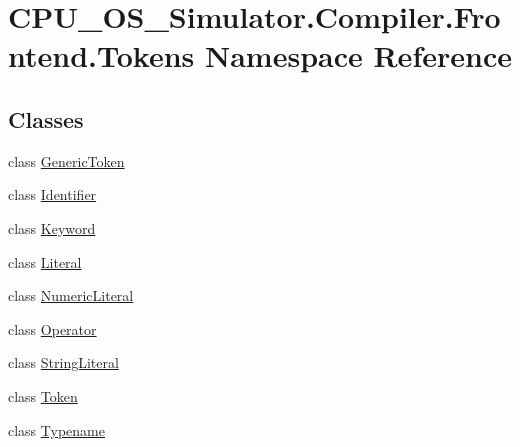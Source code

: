 \hypertarget{namespace_c_p_u___o_s___simulator_1_1_compiler_1_1_frontend_1_1_tokens}{}\section{C\+P\+U\+\_\+\+O\+S\+\_\+\+Simulator.\+Compiler.\+Frontend.\+Tokens Namespace Reference}
\label{namespace_c_p_u___o_s___simulator_1_1_compiler_1_1_frontend_1_1_tokens}
\subsection*{Classes}
\begin{DoxyCompactItemize}
\item 
class \hyperlink{class_c_p_u___o_s___simulator_1_1_compiler_1_1_frontend_1_1_tokens_1_1_generic_token}{Generic\+Token}
\item 
class \hyperlink{class_c_p_u___o_s___simulator_1_1_compiler_1_1_frontend_1_1_tokens_1_1_identifier}{Identifier}
\item 
class \hyperlink{class_c_p_u___o_s___simulator_1_1_compiler_1_1_frontend_1_1_tokens_1_1_keyword}{Keyword}
\item 
class \hyperlink{class_c_p_u___o_s___simulator_1_1_compiler_1_1_frontend_1_1_tokens_1_1_literal}{Literal}
\item 
class \hyperlink{class_c_p_u___o_s___simulator_1_1_compiler_1_1_frontend_1_1_tokens_1_1_numeric_literal}{Numeric\+Literal}
\item 
class \hyperlink{class_c_p_u___o_s___simulator_1_1_compiler_1_1_frontend_1_1_tokens_1_1_operator}{Operator}
\item 
class \hyperlink{class_c_p_u___o_s___simulator_1_1_compiler_1_1_frontend_1_1_tokens_1_1_string_literal}{String\+Literal}
\item 
class \hyperlink{class_c_p_u___o_s___simulator_1_1_compiler_1_1_frontend_1_1_tokens_1_1_token}{Token}
\item 
class \hyperlink{class_c_p_u___o_s___simulator_1_1_compiler_1_1_frontend_1_1_tokens_1_1_typename}{Typename}
\end{DoxyCompactItemize}
